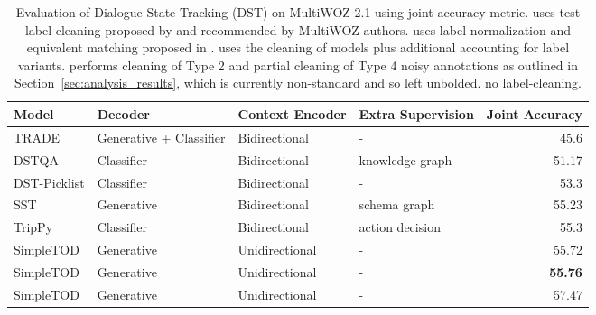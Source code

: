 \documentclass{article}
\begin{document}
\begin{table}[t]
\small
\centering
\begin{tabular}{llllr}
\hline Model & Decoder & Context Encoder & Extra Supervision & Joint Accuracy \\ 
\hline
TRADE & Generative + Classifier & Bidirectional & - & 45.6 \\ DSTQA & Classifier & Bidirectional & knowledge graph & 51.17 \\ DST-Picklist & Classifier & Bidirectional & - & 53.3 \\ 

SST & Generative & Bidirectional & schema graph & 55.23 \\
TripPy & Classifier & Bidirectional & action decision & 55.3 \\
SimpleTOD &  Generative & Unidirectional & - & 55.72 \\
SimpleTOD  &  Generative & Unidirectional & - & \textbf{55.76} \\
SimpleTOD  &  Generative & Unidirectional & - & 57.47 \\

\hline
\end{tabular}
\vspace{1mm}
\caption{\label{font-table} 
Evaluation of Dialogue State Tracking (DST) on MultiWOZ 2.1 using joint accuracy metric. 
 uses test label cleaning proposed by \citet{trade2019wu} and recommended by MultiWOZ authors. 
 uses label normalization and equivalent matching proposed in \citet{heck2020trippy}. 
 uses the cleaning of  models plus additional accounting for label variants. 
 performs cleaning of Type 2 and partial cleaning of Type 4 noisy annotations as outlined in Section~\ref{sec:analysis_results}, which is currently non-standard and so left unbolded.
 no label-cleaning. 
}
\label{tab:dst}
\end{table}
\end{document}
